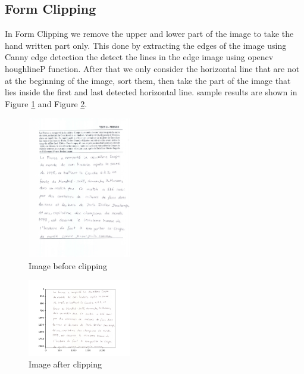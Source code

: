 
\subsection{Form Clipping}
In Form Clipping we remove the upper and lower part of the image to take the hand written part only.
This done by extracting the edges of the image using Canny edge detection the detect the lines in the edge image using opencv houghlineP function.
After that we only consider the horizontal line that are not at the beginning of the image, sort them, then take the part of the image that lies inside the first and last detected horizontal line.
sample results are shown in Figure \ref{fig:clipping-example} and Figure \ref{fig:clipping-result}.

\begin{figure}[h!]
    \centering
    \includegraphics[width=0.4\textwidth]{source/images/5.jpeg}
    \caption{Image before clipping}
    \label{fig:clipping-example}
\end{figure}

\begin{figure}[h!]
    \centering
    \includegraphics[width=0.4\textwidth]{source/images/img5_result.png}
    \caption{Image after clipping}
    \label{fig:clipping-result}
\end{figure}



